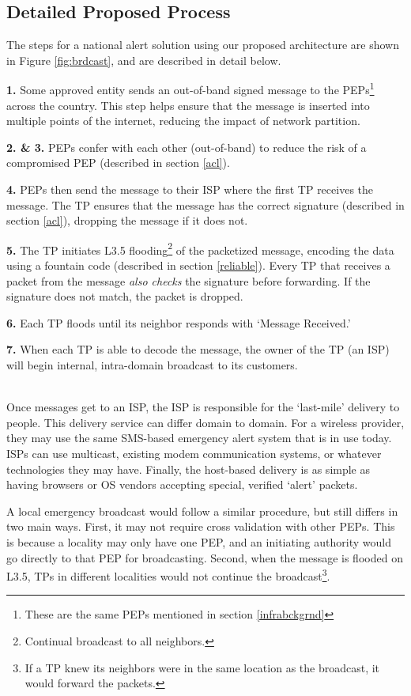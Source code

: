 \subsection{Detailed Proposed Process}
The steps for a national alert solution using our proposed architecture are shown in Figure \ref{fig:brdcast}, and are described in detail below.

\textbf{1.} Some approved entity sends an out-of-band signed message to the PEPs\footnote{These are the same PEPs mentioned in section \ref{infrabckgrnd}} across the country. This step helps ensure that the message is inserted into multiple points of the internet, reducing the impact of network partition. 

\textbf{2. \& 3.} PEPs confer with each other (out-of-band) to reduce the risk of a compromised PEP (described in section \ref{acl}). 

\textbf{4.} PEPs then send the message to their ISP where the first TP receives the message. The TP ensures that the message has the correct signature (described in section \ref{acl}), dropping the message if it does not.

\textbf{5.} The TP initiates L3.5 flooding\footnote{Continual broadcast to all neighbors.} of the packetized message, encoding the data using a fountain code (described in section \ref{reliable}). Every TP that receives a packet from the message \textit{also checks} the signature before forwarding. If the signature does not match, the packet is dropped.

\textbf{6.} Each TP floods until its neighbor responds with `Message Received.' 

\textbf{7.} When each TP is able to decode the message, the owner of the TP (an ISP) will begin internal, intra-domain broadcast to its customers.

\\
Once messages get to an ISP, the ISP is responsible for the `last-mile' delivery to people. This delivery service can differ domain to domain. For a wireless provider, they may use the same SMS-based emergency alert system that is in use today. ISPs can use multicast, existing modem communication systems, or whatever technologies they may have. Finally, the host-based delivery is as simple as having browsers or OS vendors accepting special, verified `alert' packets. 

A local emergency broadcast would follow a similar procedure, but still differs in two main ways. First, it may not require cross validation with other PEPs. This is because a locality may only have one PEP, and an initiating authority would go directly to that PEP for broadcasting. Second, when the message is flooded on L3.5, TPs in different localities would not continue the broadcast\footnote{If a TP knew its neighbors were in the same location as the broadcast, it would forward the packets.}. 

